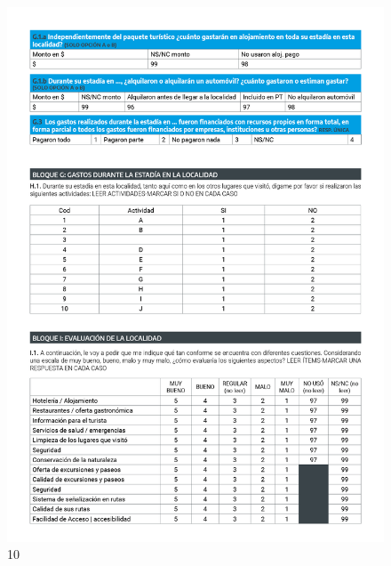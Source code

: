 \documentclass[
]{book}
\begin{document}
\begin{figure}
\includegraphics[width=17.22in]{imagenes/graf010} \caption{10}\label{fig:010}
\end{figure}
\end{document}

